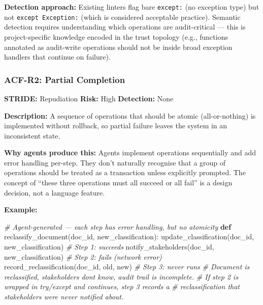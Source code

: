 \documentclass[a4paper,11pt]{report}
\newenvironment{Shaded}{\begin{snugshade}}{\end{snugshade}}
\newcommand{\CommentTok}[1]{\textcolor[rgb]{0.56,0.35,0.01}{\textit{#1}}}
\newcommand{\KeywordTok}[1]{\textcolor[rgb]{0.13,0.29,0.53}{\textbf{#1}}}
\newcommand{\NormalTok}[1]{#1}
\begin{document}
\textbf{Detection approach:} Existing linters flag bare \texttt{except:}
(no exception type) but not \texttt{except\ Exception:} (which is
considered acceptable practice). Semantic detection requires
understanding which operations are audit-critical --- this is
project-specific knowledge encoded in the trust topology (e.g.,
functions annotated as audit-write operations should not be inside broad
exception handlers that continue on failure).

\hypertarget{acf-r2-partial-completion}{%
\subsubsection{ACF-R2: Partial
Completion}\label{acf-r2-partial-completion}}

\textbf{STRIDE:} Repudiation \textbar{} \textbf{Risk:} High \textbar{}
\textbf{Detection:} None

\textbf{Description:} A sequence of operations that should be atomic
(all-or-nothing) is implemented without rollback, so partial failure
leaves the system in an inconsistent state.

\textbf{Why agents produce this:} Agents implement operations
sequentially and add error handling per-step. They don't naturally
recognise that a group of operations should be treated as a transaction
unless explicitly prompted. The concept of ``these three operations must
all succeed or all fail'' is a design decision, not a language feature.

\textbf{Example:}

\begin{Shaded}
\begin{Highlighting}[]
\CommentTok{\# Agent{-}generated — each step has error handling, but no atomicity}
\KeywordTok{def}\NormalTok{ reclassify\_document(doc\_id, new\_classification):}
\NormalTok{    update\_classification(doc\_id, new\_classification)  }\CommentTok{\# Step 1: succeeds}
\NormalTok{    notify\_stakeholders(doc\_id, new\_classification)     }\CommentTok{\# Step 2: fails (network error)}
\NormalTok{    record\_reclassification(doc\_id, old, new)           }\CommentTok{\# Step 3: never runs}
    \CommentTok{\# Document is reclassified, stakeholders don\textquotesingle{}t know, audit trail is incomplete.}
    \CommentTok{\# If step 2 is wrapped in try/except and continues, step 3 records a}
    \CommentTok{\# reclassification that stakeholders were never notified about.}
\end{Highlighting}
\end{Shaded}
\end{document}
